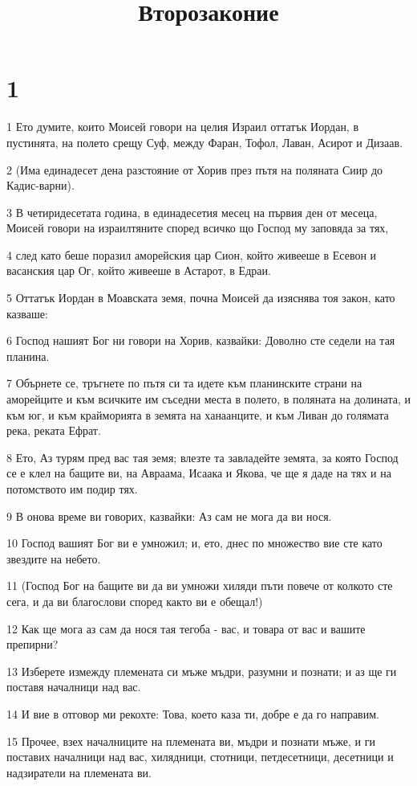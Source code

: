 

\title{Второзаконие}


\chapter{1}

\par 1 Ето думите, които Моисей говори на целия Израил оттатък Иордан, в пустинята, на полето срещу Суф, между Фаран, Тофол, Лаван, Асирот и Дизаав.
\par 2 (Има единадесет дена разстояние от Хорив през пътя на поляната Сиир до Кадис-варни).
\par 3 В четиридесетата година, в единадесетия месец на първия ден от месеца, Моисей говори на израилтяните според всичко що Господ му заповяда за тях,
\par 4 след като беше поразил аморейския цар Сион, който живееше в Есевон и васанския цар Ог, който живееше в Астарот, в Едраи.
\par 5 Оттатък Иордан в Моавската земя, почна Моисей да изяснява тоя закон, като казваше:
\par 6 Господ нашият Бог ни говори на Хорив, казвайки: Доволно сте седели на тая планина.
\par 7 Обърнете се, тръгнете по пътя си та идете към планинските страни на аморейците и към всичките им съседни места в полето, в поляната на долината, и към юг, и към крайморията в земята на ханаанците, и към Ливан до голямата река, реката Ефрат.
\par 8 Ето, Аз турям пред вас тая земя; влезте та завладейте земята, за която Господ се е клел на бащите ви, на Авраама, Исаака и Якова, че ще я даде на тях и на потомството им подир тях.
\par 9 В онова време ви говорих, казвайки: Аз сам не мога да ви нося.
\par 10 Господ вашият Бог ви е умножил; и, ето, днес по множество вие сте като звездите на небето.
\par 11 (Господ Бог на бащите ви да ви умножи хиляди пъти повече от колкото сте сега, и да ви благослови според както ви е обещал!)
\par 12 Как ще мога аз сам да нося тая тегоба - вас, и товара от вас и вашите препирни?
\par 13 Изберете измежду племената си мъже мъдри, разумни и познати; и аз ще ги поставя началници над вас.
\par 14 И вие в отговор ми рекохте: Това, което каза ти, добре е да го направим.
\par 15 Прочее, взех началниците на племената ви, мъдри и познати мъже, и ги поставих началници над вас, хилядници, стотници, петдесетници, десетници и надзиратели на племената ви.
